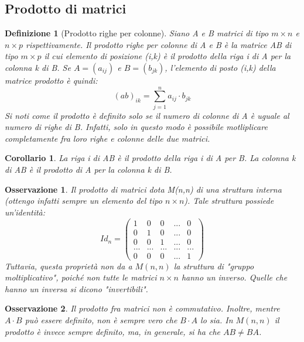 \documentclass[12pt]{article}
\newenvironment{para}{\begin{adjustwidth}{13mm}{}}{\end{adjustwidth}}
\newtheorem{Definizione}{Definizione}[subsection]
\newtheorem{Corollario}{Corollario}[subsection]
\newtheorem{Osservazione}{Osservazione}[subsection]
\begin{document}
\begin{para}
\subsection{Prodotto di matrici}
\begin{Definizione}[Prodotto righe per colonne]
Siano A e B matrici di tipo $m \times n$ e $n \times p$ rispettivamente. Il prodotto righe per colonne di A e B è la matrice AB di tipo $m \times p$ il cui elemento di posizione (i,k) è il prodotto della riga i di A per la colonna k di B. Se $A = (a_{ij})$ e $B =(b_{jk})$, l'elemento di posto (i,k) della matrice prodotto è quindi:
$$(ab)_{ik} = \sum_{j=1}^n{a_{ij} \cdot b_{jk}}$$
Si noti come il prodotto è definito solo se il numero di colonne di A è uguale al numero di righe di B. Infatti, solo in questo modo è possibile motliplicare completamente fra loro righe e colonne delle due matrici.
\end{Definizione}

\begin{Corollario}
La riga i di AB è il prodotto della riga i di A per B. La colonna k di AB è il prodotto di A per la colonna k di B.
\end{Corollario}
\newpage
\begin{Osservazione}
    Il prodotto di matrici dota M(n,n) di una struttura interna (ottengo infatti sempre un elemento del tipo $n \times n$). Tale struttura possiede un'identità:
    $$Id_n = \begin{pmatrix}
    1 & 0 & 0 & ... & 0 \\
    0 & 1 & 0 & ... & 0 \\
    0 & 0 & 1 & ... & 0 \\
    ... & ... & ... & ... & ... \\
    0 & 0 & 0 & ... & 1
\end{pmatrix}$$
Tuttavia, questa proprietà non da a $M(n, n)$ la struttura di "gruppo moltiplicativo", poiché non tutte le matrici $n \times n$ hanno un inverso. Quelle che hanno un inversa si dicono "invertibili".
\end{Osservazione}

\begin{Osservazione}
    Il prodotto fra matrici non è commutativo. Inoltre, mentre $A \cdot B$ può essere definito, non è sempre vero che $B \cdot A$ lo sia. In $M(n, n)$ il prodotto è invece sempre definito, ma, in generale, si ha che $AB \neq BA$.
\end{Osservazione}


\end{para}
\end{document}
